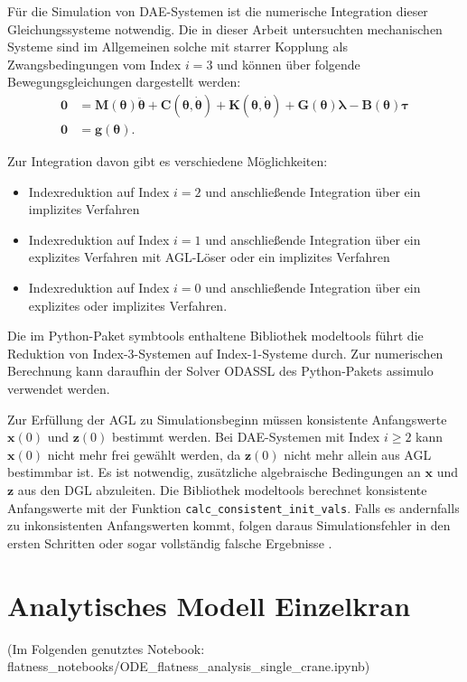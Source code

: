 Für die Simulation von DAE-Systemen ist die numerische Integration dieser Gleichungssysteme notwendig. Die in dieser Arbeit untersuchten mechanischen Systeme sind im Allgemeinen solche mit starrer Kopplung als Zwangsbedingungen vom Index $i = 3$ und können über folgende Bewegungsgleichungen dargestellt werden:
\begin{align}
\mathbf{0} &= \mathbf{M}(\mathbf{\theta}) \ddot{\mathbf{\theta}} + \mathbf{C}(\mathbf{\theta}, \dot{\mathbf{\theta}}) + \mathbf{K}(\mathbf{\theta}, \dot{\mathbf{\theta}}) + \mathbf{G}(\mathbf{\theta}) \mathbf{\lambda} - \mathbf{B}(\mathbf{\theta}) \mathbf{\tau} \\
\mathbf{0} &= \mathbf{g}(\mathbf{\theta}).
\end{align}

Zur Integration davon gibt es verschiedene Möglichkeiten: 
\begin{itemize}
\item  Indexreduktion auf Index $i = 2$ und anschließende Integration über ein implizites Verfahren
\item Indexreduktion auf Index $i = 1$ und anschließende Integration über ein explizites Verfahren mit AGL-Löser oder ein implizites Verfahren
\item Indexreduktion auf Index  $i = 0$ und anschließende Integration über ein explizites oder implizites Verfahren.
\end{itemize}
Die im Python-Paket symbtools \cite{symbtools} enthaltene Bibliothek modeltools führt die Reduktion von Index-3-Systemen auf Index-1-Systeme durch. Zur numerischen Berechnung kann daraufhin der Solver ODASSL des Python-Pakets assimulo \cite{assimulo} verwendet werden.

Zur Erfüllung der AGL zu Simulationsbeginn müssen konsistente Anfangswerte $\mathbf{x}(0)$ und $\mathbf{z}(0)$ bestimmt werden. Bei DAE-Systemen mit Index $i \geq 2$  kann $\mathbf{x}(0)$ nicht mehr frei gewählt werden, da $\mathbf{z}(0)$ nicht mehr allein aus AGL bestimmbar ist. Es ist notwendig, zusätzliche algebraische Bedingungen an $\mathbf{x}$ und $\mathbf{z}$ aus den DGL abzuleiten. Die Bibliothek modeltools berechnet konsistente Anfangswerte mit der Funktion \texttt{calc\_consistent\_init\_vals}. Falls es andernfalls zu inkonsistenten Anfangswerten kommt, folgen daraus Simulationsfehler in den ersten Schritten oder sogar vollständig falsche Ergebnisse \cite[S.207]{JanschekSystementwurf}.

\section{Analytisches Modell Einzelkran}
(Im Folgenden genutztes Notebook: flatness\_notebooks/ODE\_flatness\_analysis\_single\_crane.ipynb)

